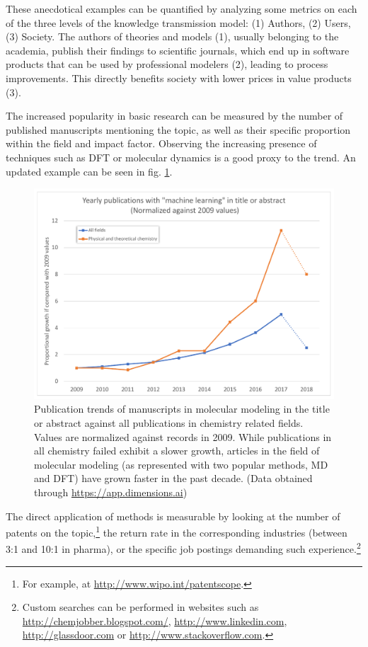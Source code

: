 These anecdotical examples can be quantified by analyzing some metrics on each of the three levels of the knowledge transmission model:\cite{warry2006} (1) Authors, (2) Users, (3) Society. The authors of theories and models (1), usually belonging to the academia, publish their findings to scientific journals, which end up in software products that can be used by professional modelers (2), leading to process improvements. This directly benefits society with lower prices in value products (3).

The increased popularity in basic research can be measured by the number of published manuscripts mentioning the topic, as well as their specific proportion within the field and impact factor. Observing the increasing presence of techniques such as DFT or molecular dynamics is a good proxy to the trend.\cite{maginn2009} An updated example can be seen in fig. \ref{fig:pubtrends}.


\begin{figure}[H]
	\includegraphics[width=\textwidth]{./figures/01/publication-trends_crop.pdf}
	\caption[Publication trends in molecular modeling]{Publication trends of manuscripts in molecular modeling in the title or abstract against all publications in chemistry related fields. Values are normalized against records in 2009. While publications in all chemistry failed exhibit a slower growth, articles in the field of molecular modeling (as represented with two popular methods, MD and DFT) have grown faster in the past decade. (Data obtained through \url{https://app.dimensions.ai})}
	\label{fig:pubtrends}
\end{figure}


The direct application of methods is measurable by looking at the number of patents on the topic,\footnote{For example, at \url{http://www.wipo.int/patentscope}.} the return rate in the corresponding industries (between 3:1 and 10:1 in pharma\cite{accelryswhitepaper}), or the specific job postings demanding such experience.\footnote{Custom searches can be performed in websites such as \url{http://chemjobber.blogspot.com/}, \url{http://www.linkedin.com}, \url{http://glassdoor.com} or \url{http://www.stackoverflow.com}.}

